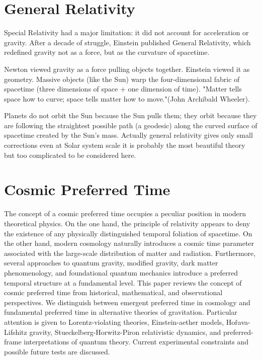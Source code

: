 \section{General Relativity}
\label{general_relativity}
Special Relativity had a major limitation: it did not account 
for acceleration or gravity. After a decade of struggle, 
Einstein published General Relativity, which redefined 
gravity not as a force, but as the curvature of spacetime.

Newton viewed gravity as a force pulling objects together. 
Einstein viewed it as geometry. Massive objects (like the Sun) 
warp the four-dimensional fabric of spacetime 
(three dimensions of space + one dimension of time).
"Matter tells space how to curve; space tells matter how to move."(John Archibald Wheeler).

Planets do not orbit the Sun because the Sun pulls them; 
they orbit because they are following the straightest possible path 
(a geodesic) along the curved surface of spacetime created by the Sun's mass.
Actually general relativity gives only small corrections even 
at Solar system scale it is probably the most beautiful theory but too
complicated to be considered here. 

\section{Cosmic Preferred Time}
\label{crt:cpt}

The concept of a cosmic preferred time occupies a peculiar position in
modern theoretical physics. On the one hand, the principle of relativity
appears to deny the existence of any physically distinguished temporal
foliation of spacetime. On the other hand, modern cosmology naturally
introduces a cosmic time parameter associated with the large-scale
distribution of matter and radiation. Furthermore, several approaches to
quantum gravity, modified gravity, dark matter phenomenology, and
foundational quantum mechanics introduce a preferred temporal structure at
a fundamental level. This paper reviews the concept of cosmic preferred
time from historical, mathematical, and observational perspectives. We
distinguish between emergent preferred time in cosmology and fundamental
preferred time in alternative theories of gravitation. Particular attention
is given to Lorentz-violating theories, Einstein-aether models,
Hořava-Lifshitz gravity, Stueckelberg-Horwitz-Piron relativistic dynamics,
and preferred-frame interpretations of quantum theory. Current experimental
constraints and possible future tests are discussed.

